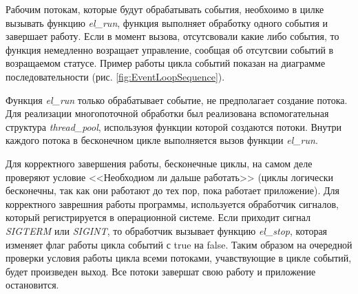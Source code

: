 \documentclass[a4paper,12pt]{report}
\begin{document}
    Рабочим потокам, которые будут обрабатывать события, необхоимо в цилке вызывать функцию \textit{el\_run}, функция выполняет обработку одного события и завершает работу. Если в момент вызова, отсутсвовали какие либо события, то функция немедленно возращает управление, сообщая об отсутсвии событий в возращаемом статусе. Пример работы цикла событий показан на диаграмме последовательности (рис. \ref{fig:EventLoopSequence}). 

Функция \textit{el\_run} только обрабатывает событие, не предполагает создание потока. Для реализации многопоточной обработки был реализована вспомогательная структура \textit{thread\_pool}, используюя функции которой создаются потоки. Внутри каждого потока в бесконечном цикле выполняется вызов функции \textit{el\_run}. 
    

    
    Для корректного завершения работы, бесконечные циклы, на самом деле проверяют условие <<Необходиом ли дальше работать>> (циклы логически бесконечны, так как они работают до тех пор, пока работает приложение). Для корректного заврешния работы программы, используется обработчик сигналов, который регистрируется в операционной системе. Если приходит сигнал \textit{SIGTERM} или \textit{SIGINT}, то обработчик вызывает функцию \textit{el\_stop}, которая изменяет флаг работы цикла событий с true на false. Таким образом на очередной проверки условия работы цикла всеми потоками, учавствующие в цикле событий, будет произведен выход. Все потоки завершат свою работу и приложение остановится.
\end{document}
